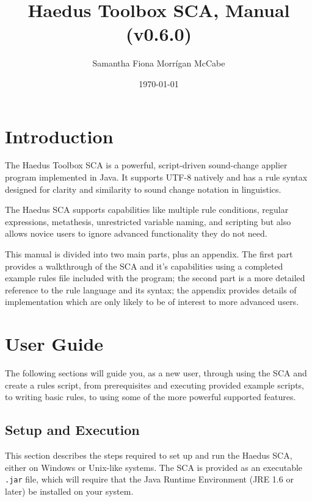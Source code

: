 \documentclass[10pt,letterpaper]{article}
\title{Haedus Toolbox SCA, Manual (v0.6.0)}
\author{Samantha Fiona Morrígan McCabe}
\date{\today}
\begin{document}
\maketitle
\tableofcontents

\section*{Introduction} 
\label{sec:introduction}
The Haedus Toolbox SCA is a powerful, script-driven sound-change applier program implemented in Java. It supports UTF-8 natively and has a rule syntax designed for clarity and similarity to sound change notation in linguistics.

The Haedus SCA supports capabilities like multiple rule conditions, regular expressions, metathesis, unrestricted variable naming, and scripting but also allows novice users to ignore advanced functionality they do not need.

This manual is divided into two main parts, plus an appendix. The first part provides a walkthrough of the SCA and it's capabilities using a completed example rules file included with the program; the second part is a more detailed reference to the rule language and its syntax; the appendix provides details of implementation which are only likely to be of interest to more advanced users.


\section{User Guide} 
\label{sec:user_guide}
The following sections will guide you, as a new user, through using the SCA and create a rules script, from prerequisites and executing provided example scripts, to writing basic rules, to using some of the more powerful supported features.


\subsection{Setup and Execution}
\label{sub:setup_and_execution}
This section describes the steps required to set up and run the Haedus SCA, either on Windows or Unix-like systems. The SCA is provided as an executable \texttt{.jar} file, which will require that the Java Runtime Environment (JRE 1.6 or later) be installed on your system.
\end{document}
